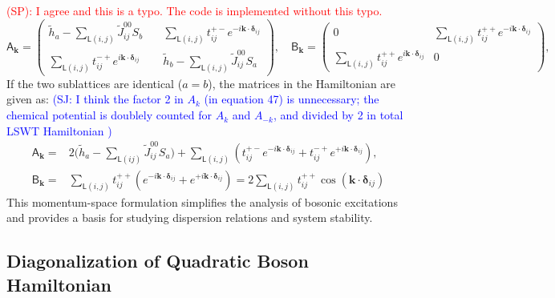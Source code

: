 \textcolor{red}{ (SP): 
    I agree and this is a typo. The code is implemented without this typo.
}
\begin{equation}
    \mathsf{A}_{\mathbf{k}} = 
    \begin{pmatrix}
        \widetilde{h}_{a} - \sum_{\mathsf{L}(i,j)} \widetilde{J}_{ij}^{00} S_{b} \quad
        & \sum_{\mathsf{L}(i,j)}t^{+-}_{ij} e^{-i \mathbf{k} \cdot \bm{\delta}_{ij}} \\[0.5em]
        \sum_{\mathsf{L}(i,j)}t^{-+}_{ij} e^{i \mathbf{k} \cdot \bm{\delta}_{ij}} \quad &
        \widetilde{h}_{b} - \sum_{\mathsf{L}(i,j)} \widetilde{J}_{ij}^{00} S_{a}
    \end{pmatrix},
    \quad  \mathsf{B}_{\mathbf{k}} =
    \begin{pmatrix}
        0   & \sum_{\mathsf{L}(i,j)}t^{++}_{ij} e^{-i \mathbf{k} \cdot \bm{\delta}_{ij}} \\[0.5em]
        \sum_{\mathsf{L}(i,j)}t^{++}_{ij} e^{i \mathbf{k} \cdot \bm{\delta}_{ij}} &    0
    \end{pmatrix},
\end{equation}
If the two sublattices are identical ($a = b$), the matrices in the Hamiltonian are given as: \textcolor{blue}{(SJ: I think the factor 2 in $A_k$ (in equation 47) is unnecessary; the chemical potential is doublely counted for $A_k$ and $A_{-k}$, and divided by 2 in total LSWT Hamiltonian )}
\begin{equation}
    \begin{split}
        \mathsf{A}_{\mathbf{k}} 
        = & 2 \Big( \widetilde{h}_{a} - \sum_{\mathsf{L}(ij)} \widetilde{J}_{ij}^{00} S_{a} \Big)
        + \sum_{\mathsf{L}(i,j)}(t_{ij}^{+-} e^{-i \mathbf{k} \cdot \bm{\delta}_{ij}} + t^{-+}_{ij} e^{+i \mathbf{k} \cdot \bm{\delta}_{ij}}), \\
        \mathsf{B}_{\mathbf{k}} 
        = & \sum_{\mathsf{L}(i,j)}t^{++}_{ij} (e^{-i \mathbf{k} \cdot \bm{\delta}_{ij}} + e^{+i \mathbf{k} \cdot \bm{\delta}_{ij}})
        = 2 \sum_{\mathsf{L}(i,j)}t^{++}_{ij} \cos ( \mathbf{k} \cdot \bm{\delta}_{ij}) 
    \end{split}
\end{equation}
This momentum-space formulation simplifies the analysis of bosonic excitations and provides a basis for studying dispersion relations and system stability.



\subsection{Diagonalization of Quadratic Boson Hamiltonian}

